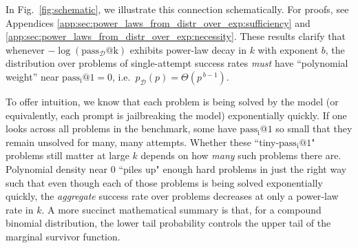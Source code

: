 In Fig.~\ref{fig:schematic}, we illustrate this connection schematically.
For proofs, see Appendices \ref{app:sec:power_laws_from_distr_over_exp:sufficiency} and \ref{app:sec:power_laws_from_distr_over_exp:necessity}.
These results clarify that whenever $-\log (\operatorname{pass_{\mathcal{D}}@k} )$ exhibits power-law decay in $k$ with exponent $b$, the distribution over problems of single-attempt success rates \emph{must} have ``polynomial weight'' near $\operatorname{pass_i@1}=0$, i.e.\ $p_{\mathcal{D}}(p) = \Theta(p^{\,b-1})$.

To offer intuition, we know that each problem is being solved by the model (or equivalently, each prompt is jailbreaking the model) exponentially quickly.
If one looks across all problems in the benchmark, some have $\operatorname{pass_i@1}$ so small that they remain unsolved for many, many attempts.
Whether these ``tiny‐$\operatorname{pass_i@1}$" problems still matter at large $k$ depends on how \emph{many} such problems there are.
Polynomial density near $0$ ``piles up" enough hard problems in just the right way such that even though each of those problems is being solved exponentially quickly, the \emph{aggregate} success rate over problems decreases at only a power‐law rate in $k$.
A more succinct mathematical summary is that, for a compound binomial distribution, the lower tail probability controls the upper tail of the marginal survivor function.